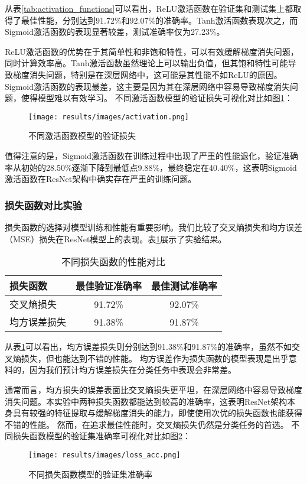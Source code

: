 \documentclass[12pt,a4paper]{article}
\begin{document}
从表\ref{tab:activation_functions}可以看出，ReLU激活函数在验证集和测试集上都取得了最佳性能，分别达到91.72\%和92.07\%的准确率。Tanh激活函数表现次之，而Sigmoid激活函数的表现显著较差，测试准确率仅为27.23\%。

ReLU激活函数的优势在于其简单性和非饱和特性，可以有效缓解梯度消失问题，同时计算效率高。Tanh激活函数虽然理论上可以输出负值，但其饱和特性可能导致梯度消失问题，特别是在深层网络中，这可能是其性能不如ReLU的原因。Sigmoid激活函数的表现最差，这主要是因为其在深层网络中容易导致梯度消失问题，使得模型难以有效学习。
不同激活函数模型的验证损失可视化对比如图\ref{fig:activation}：
\begin{figure}[htbp]
    \centering
    \texttt{[image: results/images/activation.png]}
    \caption{不同激活函数模型的验证损失}
    \label{fig:activation}
\end{figure}

值得注意的是，Sigmoid激活函数在训练过程中出现了严重的性能退化，验证准确率从初始的28.50\%逐渐下降到最低点9.88\%，最终稳定在40.40\%，这表明Sigmoid激活函数在ResNet架构中确实存在严重的训练问题。

\subsubsection{损失函数对比实验}

损失函数的选择对模型训练和性能有重要影响。我们比较了交叉熵损失和均方误差（MSE）损失在ResNet模型上的表现。表\ref{tab:loss_functions}展示了实验结果。

\begin{table}[htbp]
\centering
\caption{不同损失函数的性能对比}
\label{tab:loss_functions}
\begin{tabular}{lcc}
\toprule
\textbf{损失函数} & \textbf{最佳验证准确率} & \textbf{最佳测试准确率} \\
\midrule
交叉熵损失 & 91.72\% & 92.07\% \\
均方误差损失 & 91.38\% & 91.87\% \\
\bottomrule
\end{tabular}
\end{table}

从表\ref{tab:loss_functions}可以看出，均方误差损失则分别达到91.38\%和91.87\%的准确率，虽然不如交叉熵损失，但也能达到不错的性能。
均方误差作为损失函数的模型表现是出乎意料的，因为我们预计均方误差损失在分类任务中表现会非常差。

通常而言，均方损失的误差表面比交叉熵损失更平坦，在深层网络中容易导致梯度消失问题。本实验中两种损失函数都能达到较高的准确率，这表明ResNet架构本身具有较强的特征提取与缓解梯度消失的能力，即使使用次优的损失函数也能获得不错的性能。
然而，在追求最佳性能时，交叉熵损失仍然是分类任务的首选。
不同损失函数模型的验证集准确率可视化对比如图\ref{fig:loss_acc}：
\begin{figure}[htbp]
    \centering
    \texttt{[image: results/images/loss\_acc.png]}
    \caption{不同损失函数模型的验证集准确率}
    \label{fig:loss_acc}
\end{figure}
\end{document}
